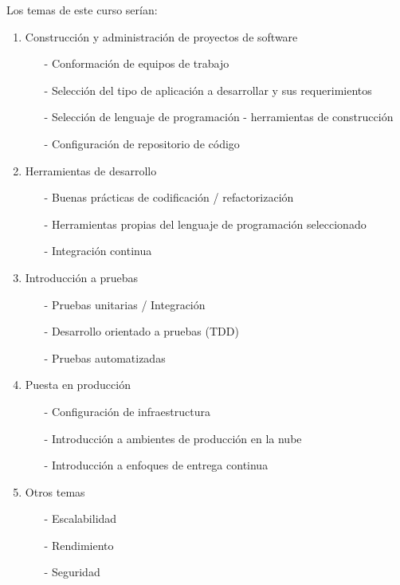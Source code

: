 Los temas de este curso serían:
\begin{enumerate}
    \item Construcción y administración de proyectos de software
    \begin{itemize}
        \item[-] Conformación de equipos de trabajo
        \item[-] Selección del tipo de aplicación a desarrollar y sus requerimientos
        \item[-] Selección de lenguaje de programación - herramientas de construcción
        \item[-] Configuración de repositorio de código
    \end{itemize}
    \item{Herramientas de desarrollo}
    \begin{itemize}
        \item[-] Buenas prácticas de codificación / refactorización
        \item[-] Herramientas propias del lenguaje de programación seleccionado
        \item[-] Integración continua 
    \end{itemize}
    \item Introducción a pruebas
    \begin{itemize}
        \item[-] Pruebas unitarias / Integración
        \item[-] Desarrollo orientado a pruebas (TDD)
        \item[-] Pruebas automatizadas 
    \end{itemize}
    \item Puesta en producción
    \begin{itemize}
        \item[-] Configuración de infraestructura
        \item[-] Introducción a ambientes de producción en la nube
        \item[-] Introducción a enfoques de entrega continua
    \end{itemize}
    \item Otros temas
    \begin{itemize}
        \item[-] Escalabilidad
        \item[-] Rendimiento 
        \item[-] Seguridad
    \end{itemize}
\end{enumerate}


